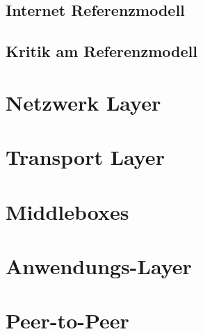 \documentclass[paper=a4, fontsize=11pt]{scrartcl}
\numberwithin{equation}{section}
\numberwithin{figure}{section}
\numberwithin{table}{section}
\begin{document}
\subsection{Internet Referenzmodell}


\subsection{Kritik am Referenzmodell}

\newpage

\section{Netzwerk Layer}

\newpage

\section{Transport Layer}

\newpage

\section{Middleboxes}

\newpage

\section{Anwendungs-Layer}

\newpage

\section{Peer-to-Peer}
\end{document}
